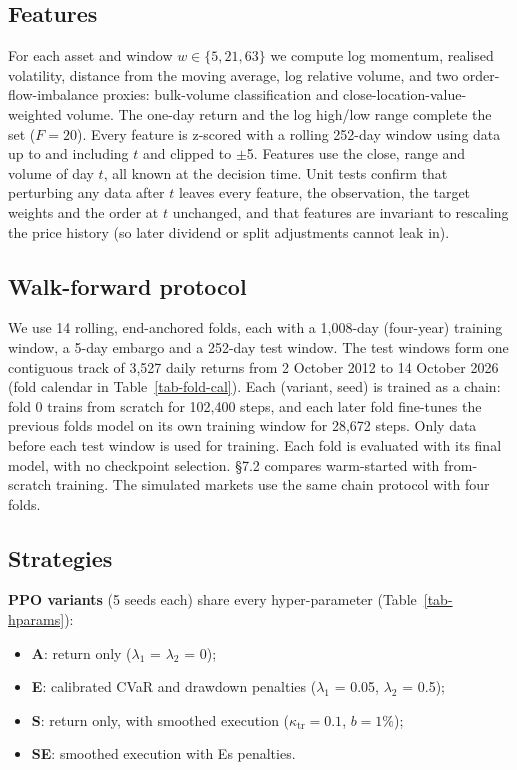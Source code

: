 \documentclass[11pt]{article}
\providecommand{\tightlist}{\setlength{\itemsep}{0pt}\setlength{\parskip}{0pt}}
\begin{document}
\subsection{Features}\label{features}

For each asset and window \(w\in\{5,21,63\}\) we compute log momentum, realised volatility, distance from the moving average, log relative volume, and two order-flow-imbalance proxies: bulk-volume classification \cite{r28} and close-location-value-weighted volume. The one-day return and the log high/low range complete the set (\(F = 20\)). Every feature is z-scored with a rolling 252-day window using data up to and including \(t\) and clipped to $\pm$5. Features use the close, range and volume of day \(t\), all known at the decision time. Unit tests confirm that perturbing any data after \(t\) leaves every feature, the observation, the target weights and the order at \(t\) unchanged, and that features are invariant to rescaling the price history (so later dividend or split adjustments cannot leak in).

\subsection{Walk-forward protocol}\label{walk-forward-protocol}

We use 14 rolling, end-anchored folds, each with a 1,008-day (four-year) training window, a 5-day embargo and a 252-day test window. The test windows form one contiguous track of 3,527 daily returns from 2 October 2012 to 14 October 2026 (fold calendar in Table~\ref{tab-fold-cal}). Each (variant, seed) is trained as a chain: fold 0 trains from scratch for 102,400 steps, and each later fold fine-tunes the previous fold\textquotesingle s model on its own training window for 28,672 steps. Only data before each test window is used for training. Each fold is evaluated with its final model, with no checkpoint selection. \S{}7.2 compares warm-started with from-scratch training. The simulated markets use the same chain protocol with four folds.

\subsection{Strategies}\label{strategies}

\textbf{PPO variants} (5 seeds each) share every hyper-parameter (Table~\ref{tab-hparams}):

\begin{itemize}
\tightlist
\item
  \textbf{A}: return only ($\lambda_1$ = $\lambda_2$ = 0);
\item
  \textbf{E}: calibrated CVaR and drawdown penalties ($\lambda_1$ = 0.05, $\lambda_2$ = 0.5);
\item
  \textbf{S}: return only, with smoothed execution (\(\kappa_{\mathrm{tr}} = 0.1\), \(b = 1\%\));
\item
  \textbf{SE}: smoothed execution with E\textquotesingle s penalties.
\end{itemize}
\end{document}

